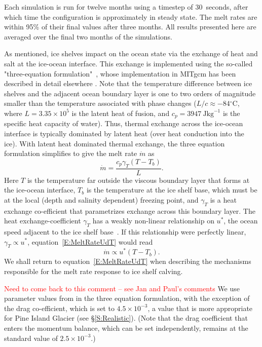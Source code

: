 \documentclass[draft]{agujournal2019}
\newcommand{\red}[1]{\textcolor{red}{#1}}
\begin{document}
Each simulation is run for twelve months using a timestep of 30~\si{seconds}, after which time the configuration is approximately in steady state. The melt rates are within 95\% of their final values after three months. All results presented here are averaged over the final two months of the simulations.

As mentioned, ice shelves impact on the ocean state via the exchange of heat and salt at the ice-ocean interface. This exchange is implemented using the so-called "three-equation formulation"~\cite{Holland1999JPhysOcean}, whose implementation in MITgcm has been described in detail elsewhere \cite[for example]{Losch2008JGeophysResOceans, DeRydt2014JGeophysResOceans,Dansereau2014JGROceans}. Note that the temperature difference between ice shelves and the adjacent ocean boundary layer is one to two orders of magnitude smaller than the temperature associated with phase changes ($L/c \approx -84{}^\circ$C, where $L=3.35\times10^5$ is the latent heat of fusion, and $c_p=3947~\si{\joule \kilogram}^{-1}$ is the specific heat capacity of water). Thus, thermal exchange across the ice-ocean interface is typically dominated by latent heat (over heat conduction into the ice). With latent heat dominated thermal exchange, the three equation formulation simplifies to give the melt rate $\dot{m}$ as
\begin{equation}\label{E:MeltRate}
    \dot{m} = \frac{c_p \gamma_T (T - T_b)}{L}.
\end{equation}
Here $T$ is the temperature far outside the viscous boundary layer that forms at the ice-ocean interface, $T_b$ is the temperature at the ice shelf base, which must be at the local (depth and salinity dependent) freezing point, and $\gamma_T$ is a heat exchange co-efficient that parametrizes exchange across this boundary layer. The heat exchange-coefficient $\gamma_T$ has a weakly non-linear relationship on $u^*$, the ocean speed adjacent to the ice shelf base~\cite{Holland1999JPhysOcean}. If this relationship were perfectly linear, $\gamma_T \propto u^*$, equation~\eqref{E:MeltRateUdT} would read
\begin{equation}\label{E:MeltRateUdT}
    \dot{m} \propto u^* (T - T_b).
\end{equation}
We shall return to equation~\eqref{E:MeltRateUdT} when describing the mechanisms responsible for the melt rate response to ice shelf calving.

\red{Need to come back to this comment -- see Jan and Paul's comments}
We use parameter values from  in the three equation formulation, with the exception of the drag co-efficient, which is set to $4.5\times10^{-3}$, a value that is more appropriate for Pine Island Glacier (see \S\ref{S:Realistic}). (Note that the drag coefficient that enters the momentum balance, which can be set independently, remains at the standard value of $2.5\times 10^{-3}$.)
\end{document}
